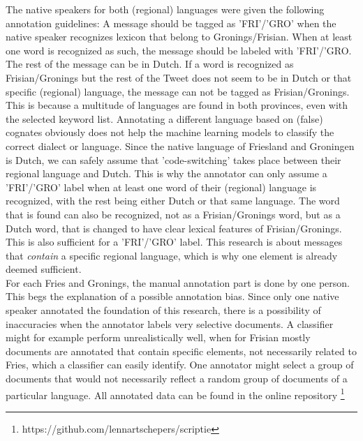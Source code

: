 \documentclass[
10pt, %
a4paper, %
oneside, %
headinclude,footinclude, %
] {book}%
\begin{document}
The native speakers for both (regional) languages were given the following annotation guidelines: A message should be tagged as 'FRI'/'GRO' when the native speaker recognizes lexicon that belong to Gronings/Frisian. When at least one word is recognized as such, the message should be labeled with 'FRI'/'GRO. The rest of the message can be in Dutch. If a word is recognized as Frisian/Gronings but the rest of the Tweet does not seem to be in Dutch or that specific (regional) language, the message can not be tagged as Frisian/Gronings. This is because a multitude of languages are found in both provinces, even with the selected keyword list. Annotating a different language based on (false) cognates obviously does not help the machine learning models to classify the correct dialect or language. Since the native language of Friesland and Groningen is Dutch, we can safely assume that 'code-switching' takes place between their regional language and Dutch. This is why the annotator can only assume a 'FRI'/'GRO' label when at least one word of their (regional) language is recognized, with the rest being either Dutch or that same language. The word that is found can also be recognized, not as a Frisian/Gronings word, but as a Dutch word, that is changed to have clear lexical features of Frisian/Gronings. This is also sufficient for a 'FRI'/'GRO' label. This research is about messages that \emph{contain} a specific regional language, which is why one element is already deemed sufficient. \\

For each Fries and Gronings, the manual annotation part is done by one person. This begs the explanation of a possible annotation bias. Since only one native speaker annotated the foundation of this research, there is a possibility of inaccuracies when the annotator labels very selective documents. A classifier might for example perform unrealistically well, when for Frisian mostly documents are annotated that contain specific elements, not necessarily related to Fries, which a classifier can easily identify. One annotator might select a group of documents that would not necessarily reflect a random group of documents of a particular language. All annotated data can be found in the online repository \footnote{https://github.com/lennartschepers/scriptie}
\end{document}
